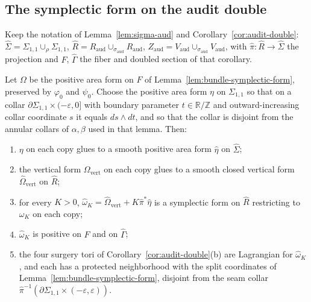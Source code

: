 
\subsection{The symplectic form on the audit double}\label{sec:symplectic-double}

Keep the notation of Lemma~\ref{lem:sigma-aud} and
Corollary~\ref{cor:audit-double}: $\hat\Sigma=\Sigma_{1,1}\cup_\rho\Sigma_{1,1}$,
$\hat R=R_{\mathrm{aud}}\cup_{\sigma_{\mathrm{aud}}}R_{\mathrm{aud}}$,
$Z_{\mathrm{aud}}=V_{\mathrm{aud}}\cup_{\sigma_{\mathrm{aud}}}V_{\mathrm{aud}}$,
with $\hat\pi\colon\hat R\to\hat\Sigma$ the projection and $F$, $\hat\Gamma$
the fiber and doubled section of that corollary.

\begin{lemma}\label{lem:double-form}
Let $\Omega$ be the positive area form on $F$ of
Lemma~\ref{lem:bundle-symplectic-form}, preserved by $\varphi_0$ and
$\psi_0$.  Choose the positive area form $\eta$ on $\Sigma_{1,1}$ so that on
a collar $\partial\Sigma_{1,1}\times(-\varepsilon,0]$ with boundary parameter
$t\in\mathbb R/\mathbb Z$ and outward-increasing collar coordinate $s$ it
equals $ds\wedge dt$, and so that the collar is disjoint from the annular
collars of $\alpha,\beta$ used in that lemma.  Then:
\begin{enumerate}
\item[(i)] $\eta$ on each copy glues to a smooth positive area form
 $\hat\eta$ on $\hat\Sigma$;
\item[(ii)] the vertical form $\Omega_{\mathrm{vert}}$ on each copy glues to
 a smooth closed vertical form $\hat\Omega_{\mathrm{vert}}$ on $\hat R$;
\item[(iii)] for every $K>0$,
 $\hat\omega_K=\hat\Omega_{\mathrm{vert}}+K\hat\pi^*\hat\eta$ is a
 symplectic form on $\hat R$ restricting to $\omega_K$ on each copy;
\item[(iv)] $\hat\omega_K$ is positive on $F$ and on $\hat\Gamma$;
\item[(v)] the four surgery tori of Corollary~\ref{cor:audit-double}(b) are
 Lagrangian for $\hat\omega_K$, and each has a protected neighborhood with
 the split coordinates of Lemma~\ref{lem:bundle-symplectic-form}, disjoint
 from the seam collar $\hat\pi^{-1}(\partial\Sigma_{1,1}\times(-\varepsilon,\varepsilon))$.
\end{enumerate}
\end{lemma}

